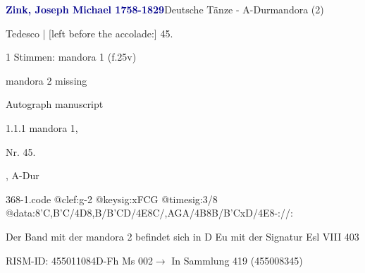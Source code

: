 \documentclass[twocolumn, 12pt]{book}
\begin{document}
\par \vspace{16pt} \textcolor{darkblue}{\textbf{Zink, Joseph Michael  1758-1829}}\hfillplus{\textbf{[368]}}\newline Deutsche Tänze - A-Dur\newline mandora (2)
\par \begin{itshape}[f.25v, at left:] Tedesco | [left before the accolade:] 45.\end{itshape} 
\par \textcolor{darkblue}{}  1 Stimmen: mandora 1  (f.25v)\newline \begin{small} mandora 2 missing\end{small} \newline Autograph manuscript
\par 1.1.1  mandora 1, \begin{itshape}Nr. 45.\end{itshape}, A-Dur  
\begin{filecontents*}{368-1.code}
@clef:g-2
@keysig:xFCG
@timesig:3/8
@data:8'C,B'C/4D8,B/B'CD/4E8C/,A{GA}/4B8B/B'CxD/4E8-://:
\end{filecontents*}
\newline %
\par Der Band mit der mandora 2 befindet sich in D Eu mit der Signatur Esl VIII 403
\par RISM-ID: 455011084\newline D-Fh  Ms 002\newline $\rightarrow$ In Sammlung 419 (455008345)
      
\end{document}
